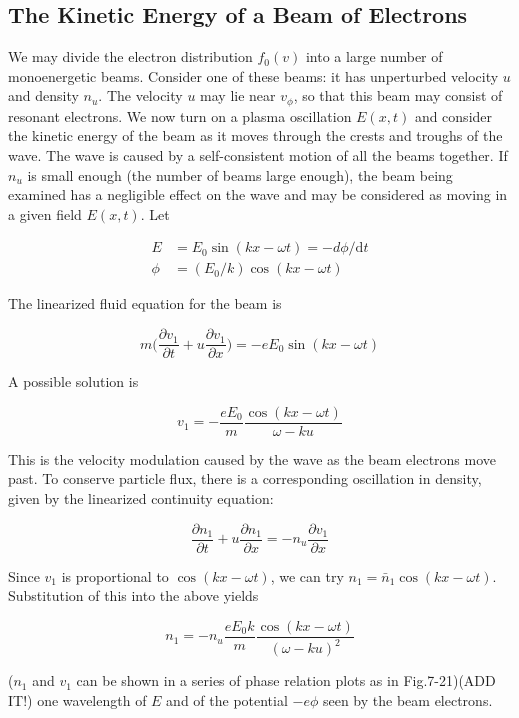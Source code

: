 \documentclass[
  notoc %
]{tufte-book}
\begin{document}
\hypertarget{the-kinetic-energy-of-a-beam-of-electrons}{%
\subsection{The Kinetic Energy of a Beam of
Electrons}\label{the-kinetic-energy-of-a-beam-of-electrons}}

We may divide the electron distribution \(f_0(v)\) into a large number
of monoenergetic beams. Consider one of these beams: it has unperturbed
velocity \(u\) and density \(n_u\). The velocity \(u\) may lie near
\(v_\phi\), so that this beam may consist of resonant electrons. We now
turn on a plasma oscillation \(E(x,t)\) and consider the kinetic energy
of the beam as it moves through the crests and troughs of the wave. The
wave is caused by a self-consistent motion of all the beams together. If
\(n_u\) is small enough (the number of beams large enough), the beam
being examined has a negligible effect on the wave and may be considered
as moving in a given field \(E(x,t)\). Let

\[
\begin{aligned}
E &= E_0\sin(kx-\omega t) = -d\phi/\mathrm{d}t \\
\phi &= (E_0/k)\cos(kx-\omega t)
\end{aligned}
\]

The linearized fluid equation for the beam is

\[
m\Big(\frac{\partial v_1}{\partial t} + u\frac{\partial v_1}{\partial x} \Big) = -eE_0\sin(kx-\omega t)
\]

A possible solution is

\[
v_1 = -\frac{eE_0}{m}\frac{\cos(kx-\omega t)}{\omega-ku}
\]

This is the velocity modulation caused by the wave as the beam electrons
move past. To conserve particle flux, there is a corresponding
oscillation in density, given by the linearized continuity equation:

\[
\frac{\partial n_1}{\partial t} + u\frac{\partial n_1}{\partial x} = -n_u\frac{\partial v_1}{\partial x}
\]

Since \(v_1\) is proportional to \(\cos(kx-\omega t)\), we can try
\(n_1 = \bar{n}_1 \cos(kx-\omega t)\). Substitution of this into the
above yields

\[
n_1 = -n_u\frac{eE_0 k}{m}\frac{\cos(kx-\omega t)}{(\omega-ku)^2}
\]

(\(n_1\) and \(v_1\) can be shown in a series of phase relation plots as
in Fig.7-21)(ADD IT!) one wavelength of \(E\) and of the potential
\(-e\phi\) seen by the beam electrons.
\end{document}
